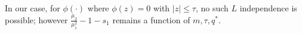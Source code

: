 \documentclass{article}
\theoremstyle{plain}
\theoremstyle{definition}
\theoremstyle{remark}
\begin{document}
In our case, for $\phi \left(  \cdot \right)$ where $\phi \left( z\right) =0 $ with $|z| \leq \tau$, no such $L$ independence is possible; however $\frac{\mu_2}{\mu_1^2} -1 -s_1$ remains a function of $m, \tau, q^*$.






\end{document}
